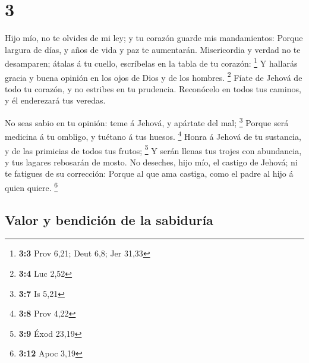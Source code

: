 \hypertarget{section-2}{%
\section{3}\label{section-2}}

 Hijo mío, no te olvides de mi ley; y tu corazón guarde mis
mandamientos:  Porque largura de días, y años de vida y paz
te aumentarán.  Misericordia y verdad no te desamparen;
átalas á tu cuello, escríbelas en la tabla de tu corazón: \footnote{\textbf{3:3}
  Prov 6,21; Deut 6,8; Jer 31,33}  Y hallarás gracia y buena
opinión en los ojos de Dios y de los hombres. \footnote{\textbf{3:4} Luc
  2,52}  Fíate de Jehová de todo tu corazón, y no estribes
en tu prudencia.  Reconócelo en todos tus caminos, y él
enderezará tus veredas.

 No seas sabio en tu opinión: teme á Jehová, y apártate del
mal; \footnote{\textbf{3:7} Is 5,21}  Porque será medicina á
tu ombligo, y tuétano á tus huesos. \footnote{\textbf{3:8} Prov 4,22}
 Honra á Jehová de tu sustancia, y de las primicias de todos
tus frutos; \footnote{\textbf{3:9} Éxod 23,19}  Y serán
llenas tus trojes con abundancia, y tus lagares rebosarán de mosto.
 No deseches, hijo mío, el castigo de Jehová; ni te
fatigues de su corrección:  Porque al que ama castiga, como
el padre al hijo á quien quiere. \footnote{\textbf{3:12} Apoc 3,19}

\hypertarget{valor-y-bendiciuxf3n-de-la-sabiduruxeda}{%
\subsection{Valor y bendición de la
sabiduría}\label{valor-y-bendiciuxf3n-de-la-sabiduruxeda}}

